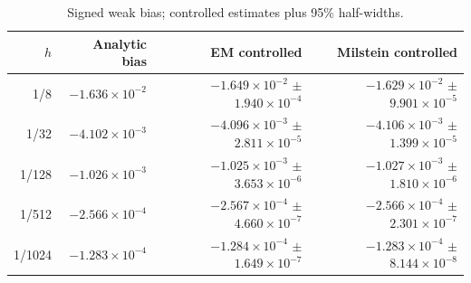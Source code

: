 \begin{table}[H]\centering\small
\caption{Signed weak bias; controlled estimates plus 95\% half-widths.}
\begin{tabular}{rrrr}\toprule
$h$ & Analytic bias & EM controlled & Milstein controlled\\\midrule
1/8 & $-1.636\times10^{-2}$ & $-1.649\times10^{-2}$ $\pm$ $1.940\times10^{-4}$ & $-1.629\times10^{-2}$ $\pm$ $9.901\times10^{-5}$\\
1/32 & $-4.102\times10^{-3}$ & $-4.096\times10^{-3}$ $\pm$ $2.811\times10^{-5}$ & $-4.106\times10^{-3}$ $\pm$ $1.399\times10^{-5}$\\
1/128 & $-1.026\times10^{-3}$ & $-1.025\times10^{-3}$ $\pm$ $3.653\times10^{-6}$ & $-1.027\times10^{-3}$ $\pm$ $1.810\times10^{-6}$\\
1/512 & $-2.566\times10^{-4}$ & $-2.567\times10^{-4}$ $\pm$ $4.660\times10^{-7}$ & $-2.566\times10^{-4}$ $\pm$ $2.301\times10^{-7}$\\
1/1024 & $-1.283\times10^{-4}$ & $-1.284\times10^{-4}$ $\pm$ $1.649\times10^{-7}$ & $-1.283\times10^{-4}$ $\pm$ $8.144\times10^{-8}$\\
\bottomrule\end{tabular}
\end{table}
